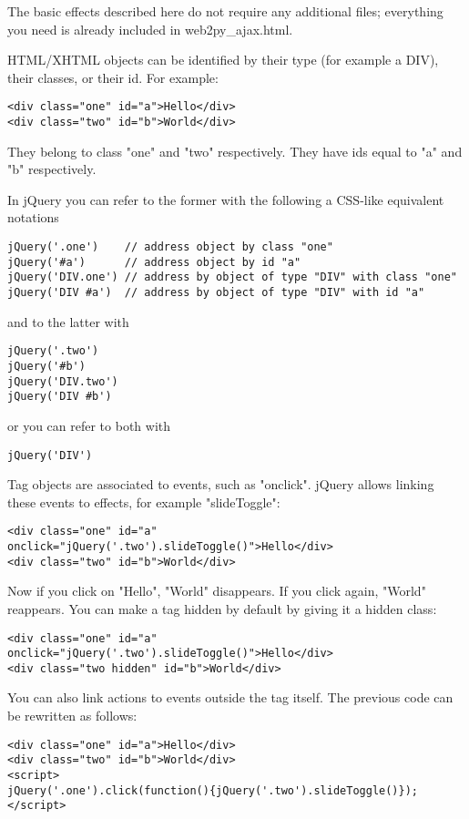 \documentclass[justified,sixbynine,notoc]{tufte-book}
\def\inxx#1{\index{#1}}
\begin{document}
\begin{fullwidth}
\inxx{effects}

The basic effects described here do not require any additional files; everything you need is already included in web2py\_ajax.html.

HTML/XHTML objects can be identified by their type (for example a DIV), their classes, or their id. For example:
\begin{lstlisting}[keywords={}]
<div class="one" id="a">Hello</div>
<div class="two" id="b">World</div>
\end{lstlisting}

They belong to class "one" and "two" respectively. They have ids equal to "a" and "b" respectively.

In jQuery you can refer to the former with the following a CSS-like equivalent notations
\begin{lstlisting}
jQuery('.one')    // address object by class "one"
jQuery('#a')      // address object by id "a"
jQuery('DIV.one') // address by object of type "DIV" with class "one"
jQuery('DIV #a')  // address by object of type "DIV" with id "a"
\end{lstlisting}
\noindent and to the latter with
\begin{lstlisting}
jQuery('.two')
jQuery('#b')
jQuery('DIV.two')
jQuery('DIV #b')
\end{lstlisting}
\noindent or you can refer to both with
\begin{lstlisting}
jQuery('DIV')
\end{lstlisting}

Tag objects are associated to events, such as "onclick". jQuery allows linking these events to effects, for example "slideToggle":
\begin{lstlisting}[keywords={}]
<div class="one" id="a" onclick="jQuery('.two').slideToggle()">Hello</div>
<div class="two" id="b">World</div>
\end{lstlisting}

Now if you click on "Hello", "World" disappears. If you click again, "World" reappears. You can make a tag hidden by default by giving it a hidden class:

\begin{lstlisting}[keywords={}]
<div class="one" id="a" onclick="jQuery('.two').slideToggle()">Hello</div>
<div class="two hidden" id="b">World</div>
\end{lstlisting}

You can also link actions to events outside the tag itself. The previous code can be rewritten as follows:
\begin{lstlisting}[keywords={}]
<div class="one" id="a">Hello</div>
<div class="two" id="b">World</div>
<script>
jQuery('.one').click(function(){jQuery('.two').slideToggle()});
</script>
\end{lstlisting}


\end{fullwidth}
\end{document}
